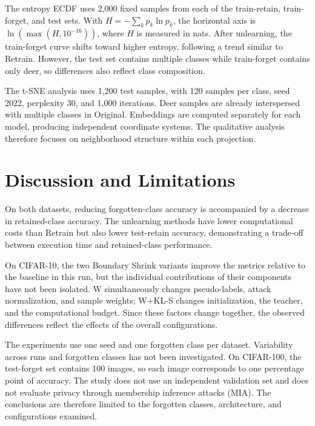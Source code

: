 \documentclass[conference]{IEEEtran}
\begin{document}
The entropy ECDF uses 2,000 fixed samples from each of the train-retain, train-forget, and test sets. With $H=-\sum_kp_k\ln p_k$, the horizontal axis is $\ln(\max(H,10^{-16}))$, where $H$ is measured in nats. After unlearning, the train-forget curve shifts toward higher entropy, following a trend similar to Retrain. However, the test set contains multiple classes while train-forget contains only deer, so differences also reflect class composition.

The t-SNE analysis uses 1,200 test samples, with 120 samples per class, seed 2022, perplexity 30, and 1,000 iterations. Deer samples are already interspersed with multiple classes in Original. Embeddings are computed separately for each model, producing independent coordinate systems. The qualitative analysis therefore focuses on neighborhood structure within each projection.

\section{Discussion and Limitations}
On both datasets, reducing forgotten-class accuracy is accompanied by a decrease in retained-class accuracy. The unlearning methods have lower computational costs than Retrain but also lower test-retain accuracy, demonstrating a trade-off between execution time and retained-class performance.

On CIFAR-10, the two Boundary Shrink variants improve the metrics relative to the baseline in this run, but the individual contributions of their components have not been isolated. W simultaneously changes pseudo-labels, attack normalization, and sample weights; W+KL-S changes initialization, the teacher, and the computational budget. Since these factors change together, the observed differences reflect the effects of the overall configurations.

\balance
The experiments use one seed and one forgotten class per dataset. Variability across runs and forgotten classes has not been investigated. On CIFAR-100, the test-forget set contains 100 images, so each image corresponds to one percentage point of accuracy. The study does not use an independent validation set and does not evaluate privacy through membership inference attacks (MIA). The conclusions are therefore limited to the forgotten classes, architecture, and configurations examined.
\end{document}
